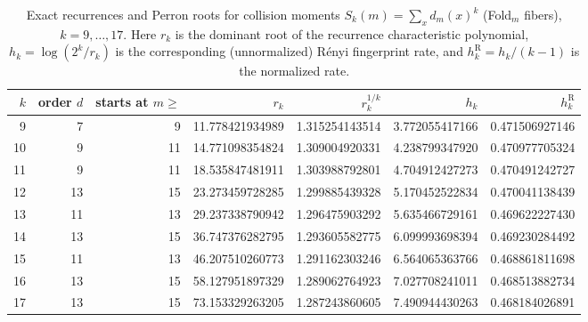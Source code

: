 \begin{table}[H]
\centering
\scriptsize
\setlength{\tabcolsep}{6pt}
\caption{Exact recurrences and Perron roots for collision moments $S_k(m)=\sum_x d_m(x)^k$ (Fold$_m$ fibers), $k=9,\dots,17$. Here $r_k$ is the dominant root of the recurrence characteristic polynomial, $h_k=\log(2^k/r_k)$ is the corresponding (unnormalized) R\'enyi fingerprint rate, and $h_k^{\mathrm R}=h_k/(k-1)$ is the normalized rate.}
\label{tab:fold_collision_moment_spectrum_k9_17}
\begin{tabular}{r r r r r r r}
\toprule
$k$ & order $d$ & starts at $m\ge$ & $r_k$ & $r_k^{1/k}$ & $h_k$ & $h_k^{\mathrm R}$\\
\midrule
9 & 7 & 9 & 11.778421934989 & 1.315254143514 & 3.772055417166 & 0.471506927146\\
10 & 9 & 11 & 14.771098354824 & 1.309004920331 & 4.238799347920 & 0.470977705324\\
11 & 9 & 11 & 18.535847481911 & 1.303988792801 & 4.704912427273 & 0.470491242727\\
12 & 13 & 15 & 23.273459728285 & 1.299885439328 & 5.170452522834 & 0.470041138439\\
13 & 11 & 13 & 29.237338790942 & 1.296475903292 & 5.635466729161 & 0.469622227430\\
14 & 13 & 15 & 36.747376282795 & 1.293605582775 & 6.099993698394 & 0.469230284492\\
15 & 11 & 13 & 46.207510260773 & 1.291162303246 & 6.564065363766 & 0.468861811698\\
16 & 13 & 15 & 58.127951897329 & 1.289062764923 & 7.027708241011 & 0.468513882734\\
17 & 13 & 15 & 73.153329263205 & 1.287243860605 & 7.490944430263 & 0.468184026891\\
\bottomrule
\end{tabular}
\end{table}
